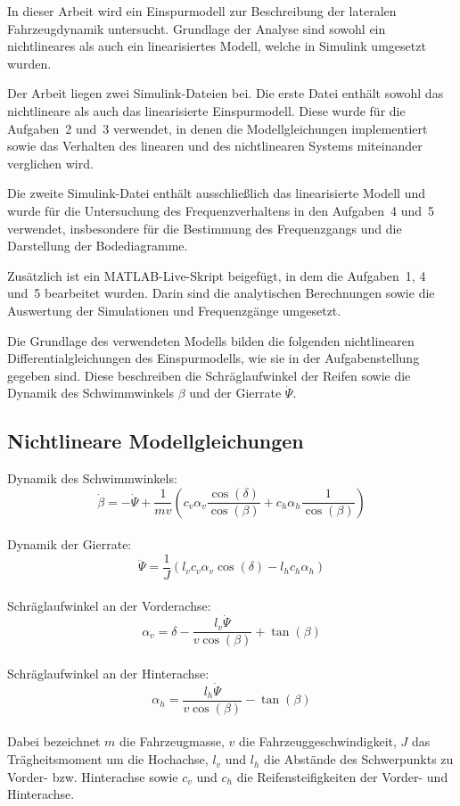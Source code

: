 
In dieser Arbeit wird ein Einspurmodell zur Beschreibung der lateralen Fahrzeugdynamik
untersucht. Grundlage der Analyse sind sowohl ein nichtlineares als auch ein linearisiertes
Modell, welche in Simulink umgesetzt wurden.

Der Arbeit liegen zwei Simulink-Dateien bei. Die erste Datei enthält sowohl das
nichtlineare als auch das linearisierte Einspurmodell. Diese wurde für die Aufgaben~2 und~3
verwendet, in denen die Modellgleichungen implementiert sowie das Verhalten des linearen
und des nichtlinearen Systems miteinander verglichen wird.

Die zweite Simulink-Datei enthält ausschließlich das linearisierte Modell und wurde für die
Untersuchung des Frequenzverhaltens in den Aufgaben~4 und~5 verwendet, insbesondere für die
Bestimmung des Frequenzgangs und die Darstellung der Bodediagramme.

Zusätzlich ist ein MATLAB-Live-Skript beigefügt, in dem die Aufgaben~1, 4 und~5 bearbeitet
wurden. Darin sind die analytischen Berechnungen sowie die Auswertung der Simulationen
und Frequenzgänge umgesetzt.

Die Grundlage des verwendeten Modells bilden die folgenden nichtlinearen Differentialgleichungen
des Einspurmodells, wie sie in der Aufgabenstellung gegeben sind. Diese beschreiben die
Schräglaufwinkel der Reifen sowie die Dynamik des Schwimmwinkels $\beta$ und der Gierrate
$\dot{\Psi}$.

\subsection*{Nichtlineare Modellgleichungen}

Dynamik des Schwimmwinkels:
\begin{equation}
\dot{\beta}
=
-\dot{\Psi}
+
\frac{1}{m v}
\left(
c_v \alpha_v \frac{\cos(\delta)}{\cos(\beta)}
+
c_h \alpha_h \frac{1}{\cos(\beta)}
\right)
\label{eq:betadot}
\end{equation}
\\
Dynamik der Gierrate:
\begin{equation}
\ddot{\Psi}
=
\frac{1}{J}
\left(
l_v c_v \alpha_v \cos(\delta)
-
l_h c_h \alpha_h
\right)
\label{eq:psiddot}
\end{equation}
\\
Schräglaufwinkel an der Vorderachse:
\begin{equation}
\alpha_v
=
\delta
-
\frac{l_v \dot{\Psi}}{v \cos(\beta)}
+
\tan(\beta)
\label{eq:alphav}
\end{equation}
\\
Schräglaufwinkel an der Hinterachse:
\begin{equation}
\alpha_h
=
\frac{l_h \dot{\Psi}}{v \cos(\beta)}
-
\tan(\beta)
\label{eq:alphah}
\end{equation}
\\
Dabei bezeichnet $m$ die Fahrzeugmasse, $v$ die Fahrzeuggeschwindigkeit,
$J$ das Trägheitsmoment um die Hochachse, $l_v$ und $l_h$ die Abstände des
Schwerpunkts zu Vorder- bzw. Hinterachse sowie $c_v$ und $c_h$ die
Reifensteifigkeiten der Vorder- und Hinterachse.